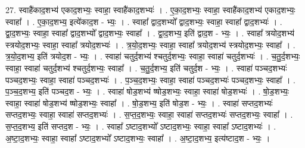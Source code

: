 \documentclass[17pt]{extarticle}
\begin{document}
27. स्वाहै॑काद॒शभ्य॑ एकाद॒शभ्यः॒ स्वाहा॒ स्वाहै॑काद॒शभ्यः॑ । . ए॒का॒द॒शभ्यः॒ स्वाहा॒ स्वाहै॑काद॒शभ्य॑ एकाद॒शभ्यः॒ स्वाहा᳚ । . ए॒का॒द॒शभ्य॒ इत्ये॑काद॒श - भ्यः॒ । . स्वाहा᳚ द्वाद॒शभ्यो᳚ द्वाद॒शभ्यः॒ स्वाहा॒ स्वाहा᳚ द्वाद॒शभ्यः॑ । . द्वा॒द॒शभ्यः॒ स्वाहा॒ स्वाहा᳚ द्वाद॒शभ्यो᳚ द्वाद॒शभ्यः॒ स्वाहा᳚ । . द्वा॒द॒शभ्य॒ इति॑ द्वाद॒श - भ्यः॒ । . स्वाहा᳚ त्रयोद॒शभ्य॑ स्त्रयोद॒शभ्यः॒ स्वाहा॒ स्वाहा᳚ त्रयोद॒शभ्यः॑ । . त्र॒यो॒द॒शभ्यः॒ स्वाहा॒ स्वाहा᳚ त्रयोद॒शभ्य॑ स्त्रयोद॒शभ्यः॒ स्वाहा᳚ । . त्र॒यो॒द॒शभ्य॒ इति॑ त्रयोद॒श - भ्यः॒ । . स्वाहा॑ चतुर्द॒शभ्य॑ श्चतुर्द॒शभ्यः॒ स्वाहा॒ स्वाहा॑ चतुर्द॒शभ्यः॑ । . च॒तु॒र्द॒शभ्यः॒ स्वाहा॒ स्वाहा॑ चतुर्द॒शभ्य॑ श्चतुर्द॒शभ्यः॒ स्वाहा᳚ । . च॒तु॒र्द॒शभ्य॒ इति॑ चतुर्द॒श - भ्यः॒ । . स्वाहा॑ पञ्चद॒शभ्यः॑ पञ्चद॒शभ्यः॒ स्वाहा॒ स्वाहा॑ पञ्चद॒शभ्यः॑ । . प॒ञ्च॒द॒शभ्यः॒ स्वाहा॒ स्वाहा॑ पञ्चद॒शभ्यः॑ पञ्चद॒शभ्यः॒ स्वाहा᳚ । . प॒ञ्च॒द॒शभ्य॒ इति॑ पञ्चद॒श - भ्यः॒ । . स्वाहा॑ षोड॒शभ्य॑ ष्षोड॒शभ्यः॒ स्वाहा॒ स्वाहा॑ षोड॒शभ्यः॑ । . षो॒ड॒शभ्यः॒ स्वाहा॒ स्वाहा॑ षोड॒शभ्य॑ ष्षोड॒शभ्यः॒ स्वाहा᳚ । . षो॒ड॒शभ्य॒ इति॑ षोड॒श - भ्यः॒ । . स्वाहा॑ सप्तद॒शभ्यः॑ सप्तद॒शभ्यः॒ स्वाहा॒ स्वाहा॑ सप्तद॒शभ्यः॑ । . स॒प्त॒द॒शभ्यः॒ स्वाहा॒ स्वाहा॑ सप्तद॒शभ्यः॑ सप्तद॒शभ्यः॒ स्वाहा᳚ । . स॒प्त॒द॒शभ्य॒ इति॑ सप्तद॒श - भ्यः॒ । . स्वाहा᳚ ऽष्टाद॒शभ्यो᳚ ऽष्टाद॒शभ्यः॒ स्वाहा॒ स्वाहा᳚ ऽष्टाद॒शभ्यः॑ । . अ॒ष्टा॒द॒शभ्यः॒ स्वाहा॒ स्वाहा᳚ ऽष्टाद॒शभ्यो᳚ ऽष्टाद॒शभ्यः॒ स्वाहा᳚ । . अ॒ष्टा॒द॒शभ्य॒ इत्य॑ष्टाद॒श - भ्यः॒ । \newline
\end{document}

